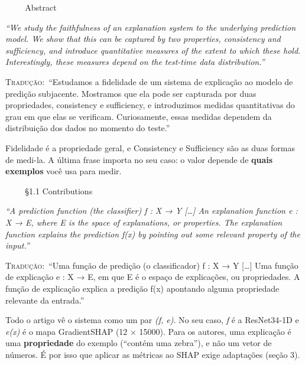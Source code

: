 \documentclass[11pt,a4paper]{article}
\newcommand{\metrictag}[2]{{\setlength{\fboxsep}{1.5pt}%
  \ifstrequal{#1}{c}{\colorbox{cC}{\textcolor{white}{\scriptsize\textbf{#2}}}}{%
  \ifstrequal{#1}{s}{\colorbox{cS}{\textcolor{white}{\scriptsize\textbf{#2}}}}{%
  \colorbox{black!60}{\textcolor{white}{\scriptsize\textbf{#2}}}}}}}
\newcommand{\pagechip}[1]{{\setlength{\fboxsep}{1.5pt}\colorbox{cAcc}{\textcolor{white}{\scriptsize\texttt{#1}}}}}
\newenvironment{origquote}{\par\itshape\small}{\par}
\newenvironment{tradquote}{\par\small\textsc{Tradução:}\ }{\par}
\newcommand{\explab}[1]{\par\smallskip{\small\color{cAcc}\textbf{\MakeUppercase{#1}}}\par}
\begin{document}
\begin{citacard}{\pagechip{p. 1} Abstract \metrictag{cs}{C + S}}
\begin{origquote}“We study the faithfulness of an explanation system to the underlying prediction model. We show that this can be captured by two properties, consistency and sufficiency, and introduce quantitative measures of the extent to which these hold. Interestingly, these measures depend on the test-time data distribution.”\end{origquote}
\begin{tradquote}“Estudamos a fidelidade de um sistema de explicação ao modelo de predição subjacente. Mostramos que ela pode ser capturada por duas propriedades, consistency e sufficiency, e introduzimos medidas quantitativas do grau em que elas se verificam. Curiosamente, essas medidas dependem da distribuição dos dados no momento do teste.”\end{tradquote}
\explab{Explicação}
Fidelidade é a propriedade geral, e Consistency e Sufficiency são as duas formas de medi-la. A última frase importa no seu caso: o valor depende de \textbf{quais exemplos} você usa para medir.
\end{citacard}

\begin{citacard}{\pagechip{p. 2} §1.1 Contributions \metrictag{cs}{C + S}}
\begin{origquote}“A prediction function (the classifier) f : X → Y […] An explanation function e : X → E, where E is the space of explanations, or properties. The explanation function explains the prediction f(x) by pointing out some relevant property of the input.”\end{origquote}
\begin{tradquote}“Uma função de predição (o classificador) f : X → Y […] Uma função de explicação e : X → E, em que E é o espaço de explicações, ou propriedades. A função de explicação explica a predição f(x) apontando alguma propriedade relevante da entrada.”\end{tradquote}
\explab{Explicação}
Todo o artigo vê o sistema como um par \textit{(f, e)}. No seu caso, \textit{f} é a ResNet34‑1D e \textit{e(x)} é o mapa GradientSHAP (12 × 15000). Para os autores, uma explicação é uma \textbf{propriedade} do exemplo (“contém uma zebra”), e não um vetor de números. É por isso que aplicar as métricas ao SHAP exige adaptações (seção 3).
\end{citacard}
\end{document}
